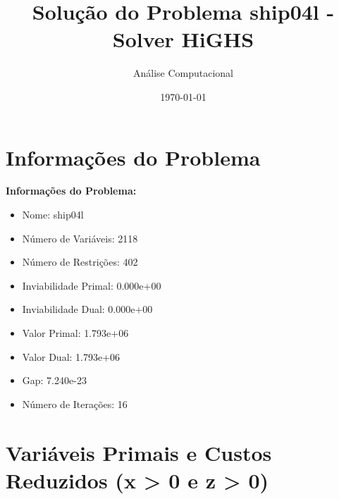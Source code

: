 \documentclass[12pt]{article}
\title{Solução do Problema ship04l - Solver HiGHS}
\author{Análise Computacional}
\date{\today}
\begin{document}
\maketitle

\section{Informações do Problema}

\textbf{Informações do Problema:}
\begin{itemize}
\item Nome: ship04l
\item Número de Variáveis: 2118
\item Número de Restrições: 402
\item Inviabilidade Primal: 0.000e+00
\item Inviabilidade Dual: 0.000e+00
\item Valor Primal: 1.793e+06
\item Valor Dual: 1.793e+06
\item Gap: 7.240e-23
\item Número de Iterações: 16
\end{itemize}


\section{Variáveis Primais e Custos Reduzidos (x > 0 e z > 0)}
\end{document}

